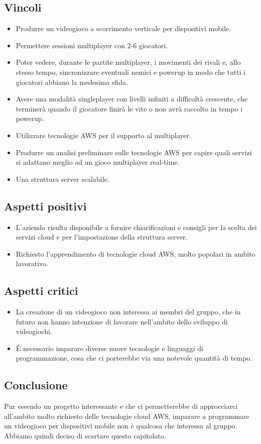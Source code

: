 \subsection{Vincoli}
\begin{itemize}
\item Produrre un videogioco a scorrimento verticale per dispositivi mobile.
\item Permettere sessioni multiplayer con 2-6 giocatori.
\item Poter vedere, durante le partite multiplayer, i movimenti dei rivali e, allo stesso tempo, sincronizzare eventuali nemici e powerup in modo che tutti i giocatori abbiano la medesima sfida.
\item Avere una modalità singleplayer con livelli infiniti a difficoltà crescente, che terminerà quando il giocatore finirà le vite o non avrà raccolto in tempo i powerup.
\item Utilizzare tecnologie AWS per il supporto al multiplayer.
\item Produrre un analisi preliminare sulle tecnologie AWS per capire quali servizi si adattano meglio ad un gioco multiplayer real-time.
\item Una struttura server scalabile.
\end{itemize}

\subsection{Aspetti positivi}
\begin{itemize}
\item L'azienda risulta disponibile a fornire chiarificazioni e consigli per la scelta dei servizi cloud e per l'impostazione della struttura server.
\item Richiesto l'apprendimento di tecnologie cloud AWS, molto popolari in ambito lavorativo.
\end{itemize}

\subsection{Aspetti critici}
\begin{itemize}
\item La creazione di un videogioco non interessa ai membri del gruppo, che in futuro non hanno intenzione di lavorare nell'ambito dello sviluppo di videogiochi.
\item É necessario imparare diverse nuove tecnologie e linguaggi di programmazione, cosa che ci porterebbe via una notevole quantità di tempo.
\end{itemize}

\subsection{Conclusione}
Pur essendo un progetto interessante e che ci permetterebbe di approcciarci all'ambito molto richiesto delle tecnologie cloud AWS, imparare a programmare un videogioco per dispositivi mobile non è qualcosa che interessa al gruppo. Abbiamo quindi deciso di scartare questo capitolato.